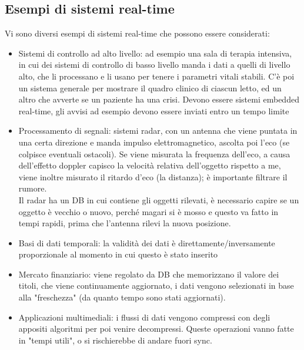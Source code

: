 \documentclass{article}
\begin{document}
\subsection{Esempi di sistemi real-time}
Vi sono diversi esempi di sistemi real-time che possono essere considerati:
\begin{itemize}
\item Sistemi di controllo ad alto livello: ad esempio una sala di terapia intensiva, in cui dei sistemi di controllo di basso livello manda i dati a quelli di livello alto, che li processano e li usano per tenere i parametri vitali stabili. C'è poi un sistema generale per mostrare il quadro clinico di ciascun letto, ed un altro che avverte se un paziente ha una crisi. Devono essere sistemi embedded real-time, gli avvisi ad esempio devono essere inviati entro un tempo limite
\item Processamento di segnali: sistemi radar, con un antenna che viene puntata in una certa direzione e manda impulso elettromagnetico, ascolta poi l'eco (se colpisce eventuali ostacoli). Se viene misurata la frequenza dell'eco, a causa dell'effetto doppler capisco la velocità relativa dell'oggetto rispetto a me, viene inoltre misurato il ritardo d'eco (la distanza); è importante filtrare il rumore.\\ Il radar ha un DB in cui contiene gli oggetti rilevati, è necessario capire se un oggetto è vecchio o nuovo, perché magari si è mosso e questo va fatto in tempi rapidi, prima che l'antenna rilevi la nuova posizione.
\item Basi di dati temporali: la validità dei dati è direttamente/inversamente proporzionale al momento in cui questo è stato inserito
\item Mercato finanziario: viene regolato da DB che memorizzano il valore dei titoli, che viene continuamente aggiornato, i dati vengono selezionati in base alla "freschezza" (da quanto tempo sono stati aggiornati).
\item Applicazioni multimediali: i flussi di dati vengono compressi con degli appositi algoritmi per poi venire decompressi. Queste operazioni vanno fatte in "tempi utili", o si rischierebbe di andare fuori sync.
\end{itemize}
\end{document}
